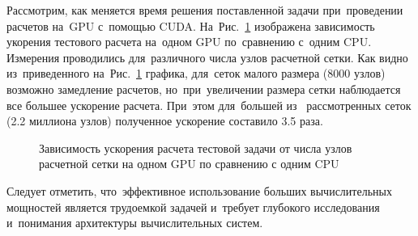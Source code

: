 Рассмотрим, как меняется время решения поставленной задачи при~проведении расчетов на~GPU
с~помощью CUDA. На~Рис.~\ref{cuda_speedup} изображена зависимость укорения тестового расчета на~одном GPU
по~сравнению с~одним CPU. Измерения проводились для~различного числа
узлов расчетной сетки. Как видно из~приведенного на~Рис.~\ref{cuda_speedup}
графика, для~сеток малого размера (8000 узлов) возможно замедление расчетов, но~при~увеличении
размера сетки наблюдается все большее ускорение расчета. При~этом для~большей из~
рассмотренных сеток (2.2 миллиона узлов) полученное ускорение составило 3.5 раза.

\begin{figure}[!h]
\begin{center}
\caption{Зависимость ускорения расчета тестовой задачи от числа узлов расчетной сетки на одном GPU по сравнению с одним CPU}
\label{cuda_speedup}
\end{center}
\end{figure}

Следует отметить, что~эффективное использование больших вычислительных
мощностей является трудоемкой задачей и~требует глубокого исследования и~понимания
архитектуры вычислительных систем.
